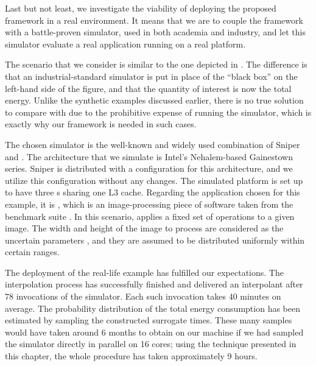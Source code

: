 Last but not least, we investigate the viability of deploying the proposed
framework in a real environment. It means that we are to couple the framework
with a battle-proven simulator, used in both academia and industry, and let this
simulator evaluate a real application running on a real platform.

The scenario that we consider is similar to the one depicted in
. The difference is that an industrial-standard
simulator is put in place of the ``black box'' on the left-hand side of the
figure, and that the quantity of interest \g is now the total energy. Unlike the
synthetic examples discussed earlier, there is no true solution to compare with
due to the prohibitive expense of running the simulator, which is exactly why
our framework is needed in such cases.

The chosen simulator is the well-known and widely used combination of Sniper
\cite{carlson2011} and  \cite{li2009}. The architecture that we
simulate is Intel's Nehalem-based Gainestown series. Sniper is distributed with
a configuration for this architecture, and we utilize this configuration without
any changes. The simulated platform is set up to have three s sharing
one L3 cache. Regarding the application chosen for this example, it is
, which is an image-processing piece of software taken from the
 benchmark suite \cite{bienia2011}. In this scenario, 
applies a fixed set of operations to a given image. The width and height of the
image to process are considered as the uncertain parameters \vu, and they are
assumed to be distributed uniformly within certain ranges.

The deployment of the real-life example has fulfilled our expectations. The
interpolation process has successfully finished and delivered an interpolant
after 78 invocations of the simulator. Each such invocation takes 40 minutes on
average. The probability distribution of the total energy consumption has been
estimated by sampling the constructed surrogate  times. These many
samples would have taken around 6 months to obtain on our machine if we had
sampled the simulator directly in parallel on 16 cores; using the technique
presented in this chapter, the whole procedure has taken approximately 9 hours.
